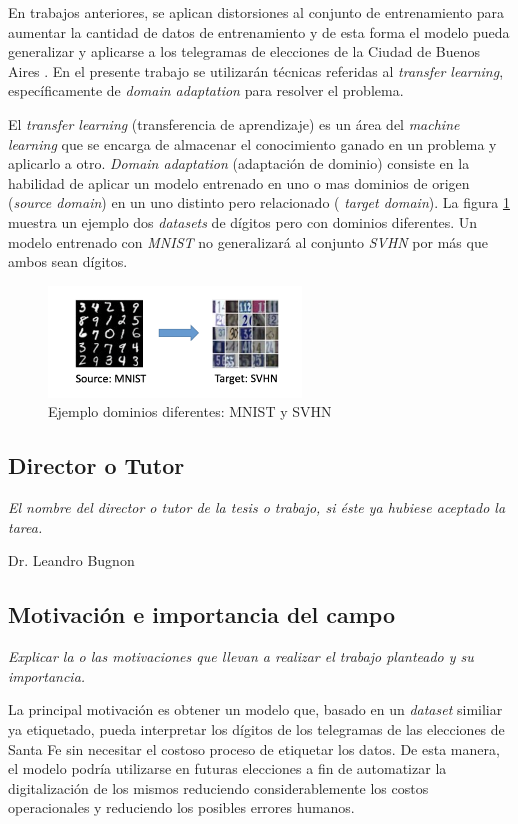 \documentclass[a4paper, twoside]{report}
\begin{document}
En trabajos anteriores, se aplican distorsiones al conjunto de entrenamiento
para aumentar la cantidad de datos de entrenamiento y de esta forma el modelo
pueda generalizar y aplicarse a los telegramas de elecciones de la Ciudad de
Buenos Aires \cite{Lamagna2016}. En el presente trabajo se utilizar\'an
t\'ecnicas referidas al {\it transfer learning}, espec\'ificamente de {\it
		domain adaptation} para resolver el problema.

El {\it transfer learning} (transferencia de aprendizaje) es un \'area del {\it
		machine learning} que se encarga de almacenar el conocimiento ganado en un
problema y aplicarlo a otro. {\it Domain adaptation} (adaptaci\'on de dominio)
consiste en la habilidad de aplicar un modelo entrenado en uno o mas dominios
de origen ({\it source domain}) en un uno distinto pero relacionado ({\it
		target domain}). La figura \ref{fig:mnist-to-svhn} muestra un ejemplo dos {\it
		datasets} de d\'igitos pero con dominios diferentes. Un modelo entrenado con
	{\it MNIST} no generalizar\'a al conjunto {\it SVHN} por m\'as que ambos sean
d\'igitos.

\begin{figure}[ht]
	\centering
	\includegraphics[width=0.6\textwidth]{mnist-to-svhn.png}
	\caption{Ejemplo dominios diferentes: MNIST y SVHN}
	\label{fig:mnist-to-svhn}
\end{figure}

\subsection*{Director o Tutor}
{\it El nombre del director o tutor de la tesis o trabajo, si éste ya
	hubiese aceptado la tarea.}

Dr. Leandro Bugnon

\subsection*{Motivación e importancia del campo}
{\it Explicar la o las motivaciones que llevan a realizar el trabajo planteado
	y su importancia.}

La principal motivaci\'on es obtener un modelo que, basado en un {\it dataset}
similiar ya etiquetado, pueda interpretar los d\'igitos de los telegramas de
las elecciones de Santa Fe sin necesitar el costoso proceso de etiquetar los
datos. De esta manera, el modelo podr\'ia utilizarse en futuras elecciones a
fin de automatizar la digitalizaci\'on de los mismos reduciendo
considerablemente los costos operacionales y reduciendo los posibles errores
humanos.
\end{document}
